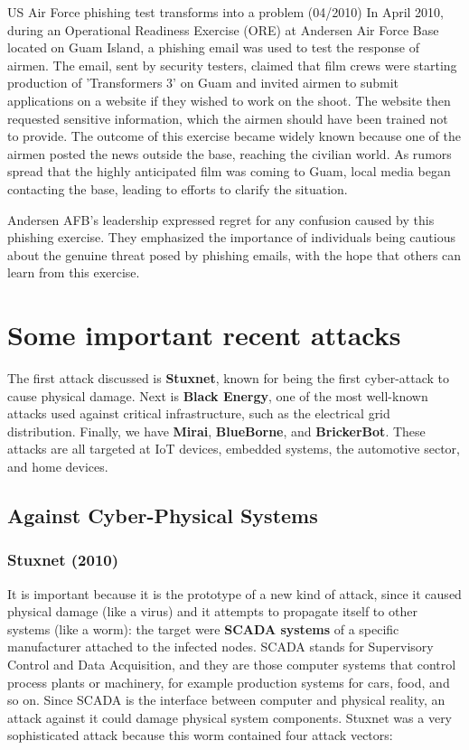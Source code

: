 \begin{casehistory}{US Air Force phishing test transforms into a problem (04/2010)}
  In April 2010, during an Operational Readiness Exercise (ORE) at Andersen Air Force Base located on Guam Island, a phishing email was used to test the response of airmen. The email, sent by security testers, claimed that film crews were starting production of 'Transformers 3' on Guam and invited airmen to submit applications on a website if they wished to work on the shoot. The website then requested sensitive information, which the airmen should have been trained not to provide. The outcome of this exercise became widely known because one of the airmen posted the news outside the base, reaching the civilian world. As rumors spread that the highly anticipated film was coming to Guam, local media began contacting the base, leading to efforts to clarify the situation.

  Andersen AFB's leadership expressed regret for any confusion caused by this phishing exercise. They emphasized the importance of individuals being cautious about the genuine threat posed by phishing emails, with the hope that others can learn from this exercise.
\end{casehistory}


\section{Some important recent attacks}
The first attack discussed is \textbf{Stuxnet}, known for being the first cyber-attack to cause physical damage. Next is \textbf{Black Energy}, one of the most well-known attacks used against critical infrastructure, such as the electrical grid distribution. Finally, we have \textbf{Mirai}, \textbf{BlueBorne}, and \textbf{BrickerBot}. These attacks are all targeted at IoT devices, embedded systems, the automotive sector, and home devices.

\subsection{Against Cyber-Physical Systems}

\subsubsection*{Stuxnet (2010)}
It is important because it is the prototype of a new kind of attack, since it caused physical damage (like a virus) and it attempts to propagate itself to other systems (like a worm): the target were \textbf{SCADA systems} of a specific manufacturer attached to the infected nodes. SCADA stands for Supervisory Control and Data Acquisition, and they are those computer systems that control process plants or machinery, for example production systems for cars, food, and so on. Since SCADA is the interface between computer and physical reality, an attack against it could damage physical system components. Stuxnet was a very sophisticated attack because this worm contained four attack vectors:

